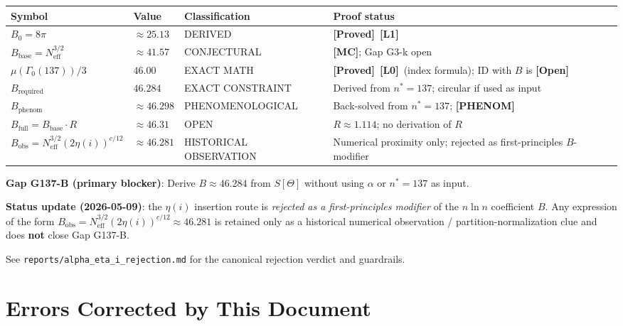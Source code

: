 \documentclass[12pt,a4paper]{article}
\theoremstyle{definition}
\theoremstyle{remark}
\newcommand{\PROVED}{\textbf{[Proved]}}
\newcommand{\OPEN}{\textbf{[Open]}}
\newcommand{\MC}{\textbf{[MC]}}
\newcommand{\Lone}{\textbf{[L1]}}
\newcommand{\Lzero}{\textbf{[L0]}}
\newcommand{\PHENOM}{\textbf{[PHENOM]}}
\begin{document}
\begin{center}
\renewcommand{\arraystretch}{1.3}
\begin{tabular}{p{4cm} p{1.8cm} p{3.5cm} p{3.5cm}}
\toprule
\textbf{Symbol} & \textbf{Value} & \textbf{Classification} & \textbf{Proof status} \\
\midrule
$B_0 = 8\pi$ & $\approx 25.13$ & DERIVED & \PROVED\ \Lone \\
$B_{\mathrm{base}} = N_{\mathrm{eff}}^{3/2}$ & $\approx 41.57$ & CONJECTURAL & \MC; Gap G3-k open \\
$\mu(\Gamma_0(137))/3$ & $46.00$ & EXACT MATH & \PROVED\ \Lzero\ (index formula); ID with $B$ is \OPEN \\
$B_{\mathrm{required}}$ & $46.284$ & EXACT CONSTRAINT & Derived from $n^*=137$; circular if used as input \\
$B_{\mathrm{phenom}}$ & $\approx 46.298$ & PHENOMENOLOGICAL & Back-solved from $n^*=137$; \PHENOM \\
$B_{\mathrm{full}} = B_{\mathrm{base}}\cdot R$ & $\approx 46.31$ & OPEN & $R \approx 1.114$; no derivation of $R$ \\
$B_{\mathrm{obs}} = N_{\mathrm{eff}}^{3/2}(2\eta(i))^{c/12}$ & $\approx 46.281$ & HISTORICAL OBSERVATION & Numerical proximity only; rejected as first-principles $B$-modifier \\
\bottomrule
\end{tabular}
\end{center}

\begin{gapbox}
\textbf{Gap G137-B (primary blocker)}: Derive $B \approx 46.284$ from
$S[\Theta]$ without using $\alpha$ or $n^*=137$ as input.

\textbf{Status update (2026-05-09)}: the $\eta(i)$ insertion route is
\emph{rejected as a first-principles modifier} of the $n\ln n$ coefficient $B$.
Any expression of the form
$B_{\mathrm{obs}} = N_{\mathrm{eff}}^{3/2}(2\eta(i))^{c/12} \approx 46.281$
is retained only as a historical numerical observation / partition-normalization
clue and does \textbf{not} close Gap G137-B.

See \texttt{reports/alpha\_eta\_i\_rejection.md} for the canonical rejection
verdict and guardrails.
\end{gapbox}

\section{Errors Corrected by This Document}
\label{sec:vc2:errors}
\end{document}
